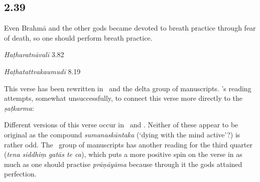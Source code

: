\begin{ekdosis}
\subsection*{2.39}
\begin{translation}[hp02_039]
Even Brahmā and the other gods became devoted to breath practice through fear of death, so one should perform breath practice.
\end{translation}


\begin{testimonia}[hp02_039]
\emph{Haṭharatnāvalī} 3.82

\begin{versinnote}
\end{versinnote}

\emph{Haṭhatattvakaumudī} 8.19

\begin{versinnote}
\end{versinnote}
\end{testimonia}

\begin{philcomm}[hp02_039]
This verse has been rewritten in \etaTwo\ and the delta group of manuscripts. \etaTwo's reading attempts, somewhat unsuccessfully, to connect this verse more directly to the \emph{ṣaṭkarma}:
\begin{versinnote}
\end{versinnote}
Different versions of this verse occur in \etaTwo\ and \zetaThree. Neither of these appear to be original as the compound \emph{sumanaskāntaka} (`dying with the mind active'?) is rather odd. The \textdelta\ group of manuscripts has another reading for the third quarter (\emph{tena siddhiṃ gatās te ca}), which puts a more positive spin on the verse in as much as one should practise \emph{prāṇāyāma} because through it the gods attained perfection. 
\end{philcomm}


\end{ekdosis}
